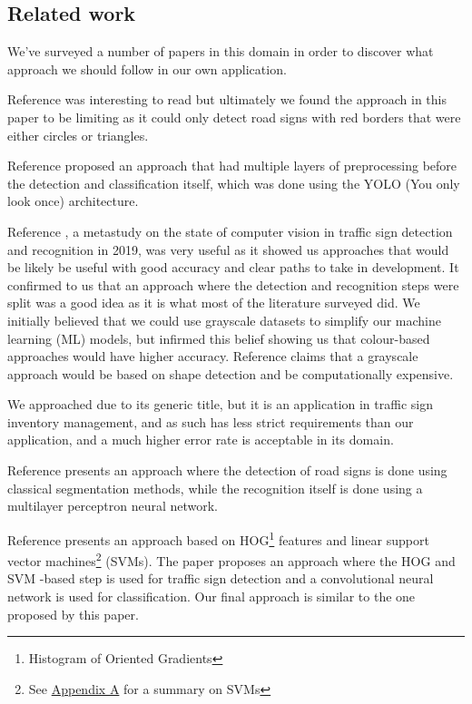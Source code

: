 \documentclass[conference]{IEEEtran}
\begin{document}

\subsection{Related work}
We've surveyed a number of papers in this domain in order to discover what approach we should follow in our
own application.

Reference \cite{4370763} was interesting to read but ultimately we found the approach in this paper
to be limiting as it could only detect road signs with red borders that were either circles or triangles.

Reference \cite{Karthika2022} proposed an approach that had multiple layers of preprocessing before
the detection and classification itself, which was done using the YOLO (You only look once) architecture.

Reference \cite{metastudy2019}, a metastudy on the state of computer vision in traffic sign detection and
recognition in 2019, was very useful as it showed us approaches that would be likely be useful
with good accuracy and clear paths to take in development. It confirmed to us that an approach where
the detection and recognition steps were split was a good idea as it is what most of the literature
surveyed did. We initially believed that we could use grayscale datasets to simplify our machine learning
(ML) models, but \cite{metastudy2019} infirmed this belief showing us that colour-based approaches would
have higher accuracy. Reference \cite{4290244} claims that a grayscale approach would be based on shape
detection and be computationally expensive.

We approached \cite{8709983} due to its generic title, but it is an application in traffic sign inventory
management, and as such has less strict requirements than our application, and a much higher error rate
is acceptable in its domain.

Reference \cite{6196571} presents an approach where the detection of road signs is done using classical
segmentation methods, while the recognition itself is done using a multilayer perceptron neural network.

Reference \cite{svm_paper} presents an approach based on HOG\footnote{Histogram of Oriented Gradients}
features and linear support vector machines\footnote{See \hyperlink{appendixa}{Appendix A} for a summary on SVMs}
(SVMs). The paper proposes an approach where the HOG and SVM -based step is used for traffic sign detection and
a convolutional neural network is used for classification. Our final approach is similar to the one proposed by this paper.
\end{document}
